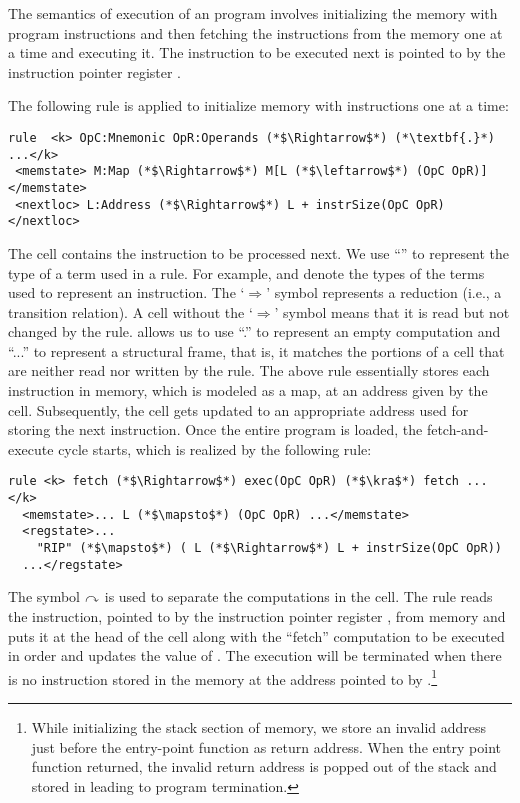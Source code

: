 The semantics of execution of an \ISA program involves initializing the memory with program instructions and then  fetching the instructions from the memory one at a time and executing it. The instruction to be executed next is pointed to by the instruction pointer register .  

The following rule is applied to initialize memory with instructions one at a time: 
\begin{lstlisting}[style=KRULE]
rule  <k> OpC:Mnemonic OpR:Operands (*$\Rightarrow$*) (*\textbf{.}*) ...</k>
 <memstate> M:Map (*$\Rightarrow$*) M[L (*$\leftarrow$*) (OpC OpR)] </memstate>
 <nextloc> L:Address (*$\Rightarrow$*) L + instrSize(OpC OpR) </nextloc>
\end{lstlisting}
The  cell contains the instruction to be processed next. We use ``'' to represent the type of a term used in a rule. For example,  and  denote the types of the terms used to represent an instruction.  The `$\Rightarrow$' symbol
represents a reduction (i.e., a transition relation). A cell without the `$\Rightarrow$' symbol means that it is read but not changed by the rule. \K allows us to use ``.'' to represent an empty computation and ``...'' to represent a structural frame, that is, it matches the portions of a cell that are neither read nor written by the rule. The above rule essentially  stores each instruction in memory, which is modeled as a map, at an address  given by the  cell. Subsequently, the  cell gets updated to an appropriate address  used for storing the next instruction.  Once the entire program is loaded, the fetch-and-execute cycle starts, which is realized by the following rule:
\begin{lstlisting}[style=KRULE]
rule <k> fetch (*$\Rightarrow$*) exec(OpC OpR) (*$\kra$*) fetch ... </k>
  <memstate>... L (*$\mapsto$*) (OpC OpR) ...</memstate>
  <regstate>... 
    "RIP" (*$\mapsto$*) ( L (*$\Rightarrow$*) L + instrSize(OpC OpR))  
  ...</regstate>
\end{lstlisting}
%
 The symbol $\curvearrowright$ is used to separate the computations in the  cell. The rule reads the instruction, pointed to by the instruction pointer register , from memory and puts it at the head of the  cell along with the ``fetch'' computation to be executed in order and updates the value of . The execution will be terminated when there is no instruction stored in the memory at the address pointed to by .\footnote{While initializing the stack section of memory, we store an invalid address just before the entry-point function as return address. When the entry point function returned, the invalid return address is popped out of the stack and stored in  leading to program termination.} 

